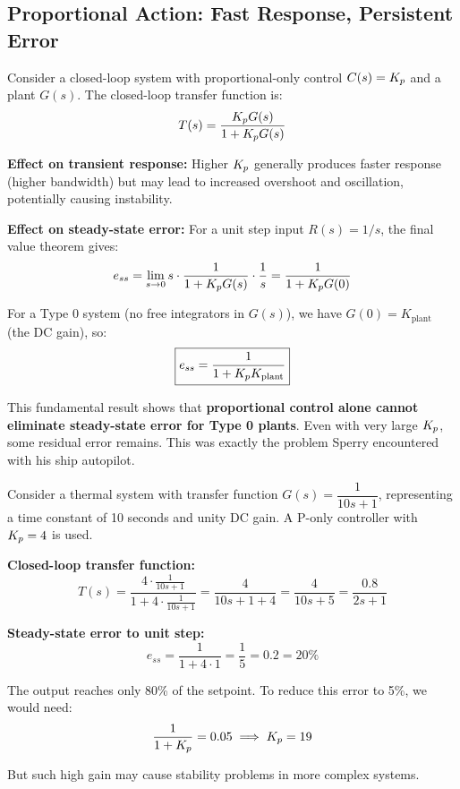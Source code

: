 \subsection{Proportional Action: Fast Response, Persistent Error}

Consider a closed-loop system with proportional-only control $C(s) = K_p$ and a plant $G(s)$. The closed-loop transfer function is:
\begin{equation}
T(s) = \frac{K_p G(s)}{1 + K_p G(s)}
\end{equation}

\textbf{Effect on transient response:} Higher $K_p$ generally produces faster response (higher bandwidth) but may lead to increased overshoot and oscillation, potentially causing instability.

\textbf{Effect on steady-state error:} For a unit step input $R(s) = 1/s$, the final value theorem gives:
\begin{equation}
e_{ss} = \lim_{s \to 0} s \cdot \frac{1}{1 + K_p G(s)} \cdot \frac{1}{s} = \frac{1}{1 + K_p G(0)}
\end{equation}

For a Type 0 system (no free integrators in $G(s)$), we have $G(0) = K_{\text{plant}}$ (the DC gain), so:
\begin{equation}
\boxed{e_{ss} = \frac{1}{1 + K_p K_{\text{plant}}}}
\label{eq:p_only_error}
\end{equation}

This fundamental result shows that \textbf{proportional control alone cannot eliminate steady-state error for Type 0 plants}. Even with very large $K_p$, some residual error remains. This was exactly the problem Sperry encountered with his ship autopilot.

\begin{example}
Consider a thermal system with transfer function $G(s) = \dfrac{1}{10s + 1}$, representing a time constant of 10 seconds and unity DC gain. A P-only controller with $K_p = 4$ is used.

\textbf{Closed-loop transfer function:}
\begin{equation*}
T(s) = \frac{4 \cdot \frac{1}{10s+1}}{1 + 4 \cdot \frac{1}{10s+1}} = \frac{4}{10s + 1 + 4} = \frac{4}{10s + 5} = \frac{0.8}{2s + 1}
\end{equation*}

\textbf{Steady-state error to unit step:}
\begin{equation*}
e_{ss} = \frac{1}{1 + 4 \cdot 1} = \frac{1}{5} = 0.2 = 20\%
\end{equation*}

The output reaches only 80\% of the setpoint. To reduce this error to 5\%, we would need:
\begin{equation*}
\frac{1}{1 + K_p} = 0.05 \implies K_p = 19
\end{equation*}

But such high gain may cause stability problems in more complex systems.
\end{example}

